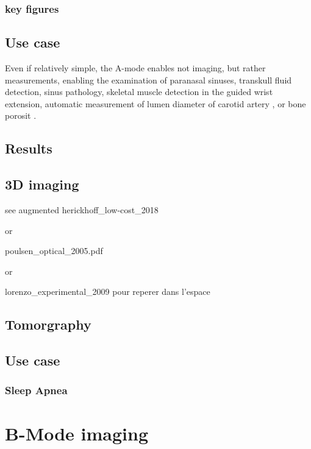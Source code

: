 \documentclass[conference]{IEEEtran}
\begin{document}
\subsubsection{key figures}

\subsection{Use case}


Even if relatively simple, the A-mode enables not imaging, but rather measurements, enabling the examination of paranasal sinuses, transkull fluid detection, sinus pathology, skeletal muscle detection in the guided wrist extension, automatic measurement of lumen diameter of carotid artery \cite{li_new_2014}, or bone porosit \cite{wahab_design_2016}.



\subsection{Results}

\subsection{3D imaging }

see augmented herickhoff_low-cost_2018

or 

poulsen_optical_2005.pdf

or 

lorenzo_experimental_2009 pour reperer dans l'espace



\subsection{Tomorgraphy}

\cite{kuzmin_fast_2016}

\subsection{Use case}

\subsubsection{Sleep Apnea}

\cite{weng_fpga-based_2015}

\section{B-Mode imaging}
\end{document}
